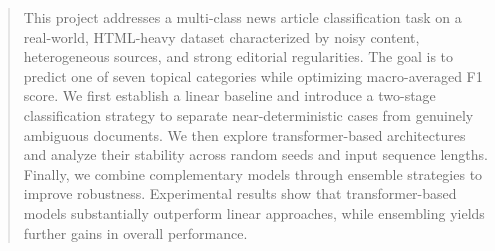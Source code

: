 \begin{abstract}
This project addresses a multi-class news article classification task on a real-world, HTML-heavy dataset characterized by noisy content, heterogeneous sources, and strong editorial regularities. The goal is to predict one of seven topical categories while optimizing macro-averaged F1 score. We first establish a linear baseline and introduce a two-stage classification strategy to separate near-deterministic cases from genuinely ambiguous documents. We then explore transformer-based architectures and analyze their stability across random seeds and input sequence lengths. Finally, we combine complementary models through ensemble strategies to improve robustness. Experimental results show that transformer-based models substantially outperform linear approaches, while ensembling yields further gains in overall performance.
\end{abstract}

